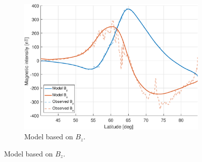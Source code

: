 \begin{figure}[ht]
    \centering
    \begin{subfigure}[b]{0.45\textwidth}
        \includegraphics[width=\textwidth]{fig/BzModel.eps}
        \caption{Model based on $B_z$.}
        \label{fig:BzModel}
    \end{subfigure}
    

\end{figure}

